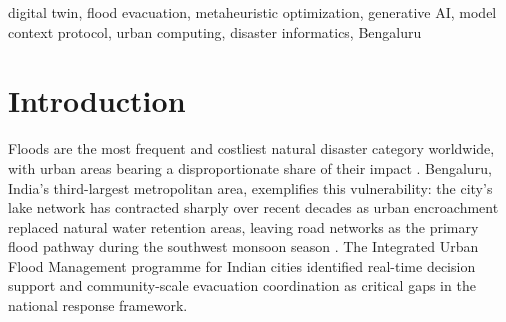 \documentclass[journal]{IEEEtran}
\begin{document}
\begin{IEEEkeywords}
digital twin, flood evacuation, metaheuristic optimization, generative AI, model context
protocol, urban computing, disaster informatics, Bengaluru
\end{IEEEkeywords}

%
%

\section{Introduction}
\label{sec:intro}

Floods are the most frequent and costliest natural disaster category worldwide, with urban
areas bearing a disproportionate share of their impact \cite{anik2025evolution}. Bengaluru,
India's third-largest metropolitan area, exemplifies this vulnerability: the city's lake
network has contracted sharply over recent decades as urban encroachment replaced natural
water retention areas, leaving road networks as the primary flood pathway during the
southwest monsoon season \cite{mujumdar2021bengaluru}. The Integrated Urban Flood Management
programme for Indian cities \cite{mujumdar2017integrated} identified real-time decision
support and community-scale evacuation coordination as critical gaps in the national response
framework.
\end{document}
